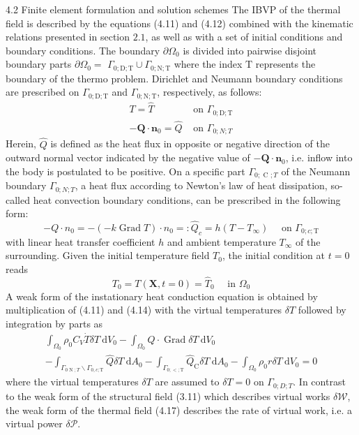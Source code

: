 4.2 Finite element formulation and solution schemes
The IBVP of the thermal field is described by the equations (4.11) and (4.12) combined with the kinematic relations presented in section \(2.1\), as well as with a set of initial conditions and boundary conditions. The boundary \(\partial \Omega_{0}\) is divided into pairwise disjoint boundary parts \(\partial \Omega_{0}=\) \(\Gamma_{0 ; \mathrm{D} ; \mathrm{T}} \cup \Gamma_{0 ; \mathrm{N} ; \mathrm{T}}\) where the index \(\mathrm{T}\) represents the boundary of the thermo problem. Dirichlet and Neumann boundary conditions are prescribed on \(\Gamma_{0 ; \mathrm{D} ; \mathrm{T}}\) and \(\Gamma_{0 ; \mathrm{N} ; \mathrm{T}}\), respectively, as follows:
\[
\begin{aligned}
T=\hat{T} & \text { on } \Gamma_{0 ; \mathrm{D} ; \mathrm{T}} \\
-\boldsymbol{Q} \cdot \boldsymbol{n}_{0}=\hat{Q} & \text { on } \Gamma_{0 ; N ; T}
\end{aligned}
\]
Herein, \(\hat{Q}\) is defined as the heat flux in opposite or negative direction of the outward normal vector indicated by the negative value of \(-\boldsymbol{Q} \cdot \boldsymbol{n}_{0}\), i.e. inflow into the body is postulated to be positive. On a specific part \(\Gamma_{0 ; \text { C } ; T}\) of the Neumann boundary \(\Gamma_{0 ; N ; T}\), a heat flux according to Newton's law of heat dissipation, so-called heat convection boundary conditions, can be prescribed in the following form:
\[
-Q \cdot n_{0}=-(-k \operatorname{Grad} T) \cdot n_{0}=: \hat{Q}_{c}=h\left(T-T_{\infty}\right) \quad \text { on } \Gamma_{0 ; c ; \mathrm{T}}
\]
with linear heat transfer coefficient \(h\) and ambient temperature \(T_{\infty}\) of the surrounding. Given the initial temperature field \(T_{0}\), the initial condition at \(t=0\) reads
\[
T_{0}=T(\boldsymbol{X}, t=0)=\hat{T}_{0} \quad \text { in } \Omega_{0}
\]
A weak form of the instationary heat conduction equation is obtained by multiplication of (4.11) and (4.14) with the virtual temperatures \(\delta T\) followed by integration by parts as
\[
\begin{array}{l}
\int_{\Omega_{0}} \rho_{0} C_{V} \dot{T} \delta T \mathrm{~d} V_{0}-\int_{\Omega_{0}} Q \cdot \operatorname{Grad} \delta T \mathrm{~d} V_{0} \\
-\int_{\Gamma_{0 \text { N } ; T} \backslash \Gamma_{0, c ; \mathrm{T}}} \hat{Q} \delta T \mathrm{~d} A_{0}-\int_{\Gamma_{0 ;<; \mathrm{T}}} \hat{Q}_{\mathrm{C}} \delta T \mathrm{~d} A_{0}-\int_{\Omega_{0}} \rho_{0} r \delta T \mathrm{~d} V_{0}=0
\end{array}
\]
where the virtual temperatures \(\delta T\) are assumed to \(\delta T=0\) on \(\Gamma_{0 ; D ; T}\). In contrast to the weak form of the structural field (3.11) which describes virtual works \(\delta \mathcal{W}\), the weak form of the thermal field (4.17) describes the rate of virtual work, i.e. a virtual power \(\delta \mathcal{P}\).

